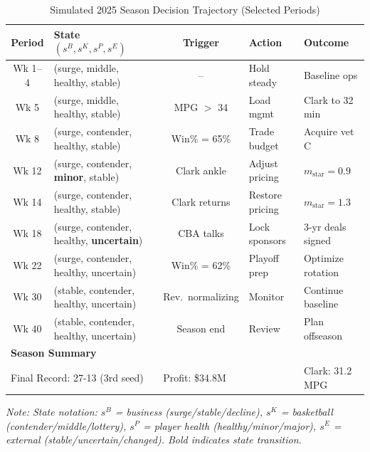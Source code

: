 \documentclass{mcmthesis}
\begin{document}
\begin{table}[H]
\centering
\caption{Simulated 2025 Season Decision Trajectory (Selected Periods)}
\label{tab:simulation}
\small
\begin{tabular}{clcll}
\toprule
\textbf{Period} & \textbf{State $(s^B, s^K, s^P, s^E)$} & \textbf{Trigger} & \textbf{Action} & \textbf{Outcome} \\
\midrule
Wk 1--4 & (surge, middle, healthy, stable) & -- & Hold steady & Baseline ops \\
Wk 5 & (surge, middle, healthy, stable) & MPG $>$ 34 & Load mgmt & Clark to 32 min \\
Wk 8 & (surge, contender, healthy, stable) & Win\% = 65\% & Trade budget & Acquire vet C \\
Wk 12 & (surge, contender, \textbf{minor}, stable) & Clark ankle & Adjust pricing & $m_{\text{star}} = 0.9$ \\
Wk 14 & (surge, contender, healthy, stable) & Clark returns & Restore pricing & $m_{\text{star}} = 1.3$ \\
Wk 18 & (surge, contender, healthy, \textbf{uncertain}) & CBA talks & Lock sponsors & 3-yr deals signed \\
Wk 22 & (surge, contender, healthy, uncertain) & Win\% = 62\% & Playoff prep & Optimize rotation \\
Wk 30 & (stable, contender, healthy, uncertain) & Rev.\ normalizing & Monitor & Continue baseline \\
Wk 40 & (stable, contender, healthy, uncertain) & Season end & Review & Plan offseason \\
\midrule
\multicolumn{4}{l}{\textbf{Season Summary}} & \\
\multicolumn{2}{l}{Final Record: 27-13 (3rd seed)} & \multicolumn{2}{l}{Profit: \$34.8M} & Clark: 31.2 MPG \\
\bottomrule
\end{tabular}
\begin{flushleft}
\footnotesize\textit{Note: State notation: $s^B$ = business (surge/stable/decline), $s^K$ = basketball (contender/middle/lottery), $s^P$ = player health (healthy/minor/major), $s^E$ = external (stable/uncertain/changed). Bold indicates state transition.}
\end{flushleft}
\end{table}
\end{document}
